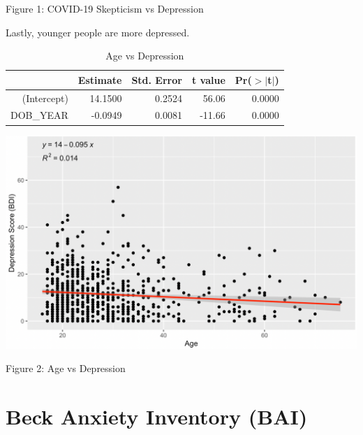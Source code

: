 \documentclass{article}
\begin{document}
{\centering Figure 1: COVID-19 Skepticism vs Depression \par}

\vspace*{\fill}

\pagebreak

\vspace*{\fill}

\noindent
Lastly, younger people are more depressed.

\begin{table}[ht]
\centering
\caption{Age vs Depression} \label{tab:title}
\begin{tabular}{rrrrr}
  \hline
 & Estimate & Std. Error & t value & Pr($>$$|$t$|$) \\ 
  \hline
(Intercept) & 14.1500 & 0.2524 & 56.06 & 0.0000 \\ 
  DOB\_YEAR & -0.0949 & 0.0081 & -11.66 & 0.0000 \\ 
   \hline
\end{tabular}
\end{table}

\bigskip
\bigskip
\bigskip
\bigskip
\bigskip


{\centering \includegraphics[scale=0.6]{BDIAGEgraph.png} \par}

{\centering Figure 2: Age vs Depression \par}

\vspace*{\fill}

\pagebreak

\section*{Beck Anxiety Inventory (BAI)}
\end{document}
